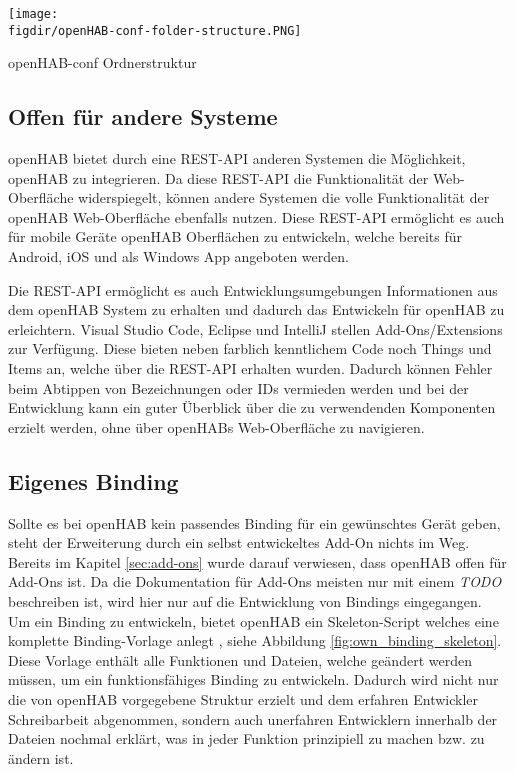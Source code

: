 \smallskip
{
	\centering
	\captionsetup{type=figure}
	\texttt{[image: \\figdir/openHAB-conf-folder-structure.PNG]}
	\caption{openHAB-conf Ordnerstruktur \label{fig:openHAB-conf-folder-structure}}
}

\subsection{Offen für andere Systeme}
openHAB bietet durch eine REST-API anderen Systemen die Möglichkeit, openHAB zu integrieren. Da diese REST-API die Funktionalität der Web-Oberfläche widerspiegelt, können andere Systemen die volle Funktionalität der openHAB Web-Oberfläche ebenfalls nutzen. Diese REST-API ermöglicht es auch für mobile Geräte openHAB Oberflächen zu entwickeln, welche bereits für Android, iOS und als Windows App angeboten werden.

Die REST-API ermöglicht es auch Entwicklungsumgebungen Informationen aus dem openHAB System zu erhalten und dadurch das Entwickeln für openHAB zu erleichtern. Visual Studio Code, Eclipse und IntelliJ stellen Add-Ons/Extensions zur Verfügung. Diese bieten neben farblich kenntlichem Code noch Things und Items an, welche über die REST-API erhalten wurden. Dadurch können Fehler beim Abtippen von Bezeichnungen oder IDs vermieden werden und bei der Entwicklung kann ein guter Überblick über die zu verwendenden Komponenten erzielt werden, ohne über openHABs Web-Oberfläche zu navigieren.

\subsection{Eigenes Binding}
Sollte es bei openHAB kein passendes Binding für ein gewünschtes Gerät geben, steht der Erweiterung durch ein selbst entwickeltes Add-On nichts im Weg. Bereits im Kapitel \ref{sec:add-ons} wurde darauf verwiesen, dass openHAB offen für Add-Ons ist. Da die Dokumentation für Add-Ons meisten nur mit einem \textit{TODO} beschreiben ist, wird hier nur auf die Entwicklung von Bindings eingegangen.\\
Um ein Binding zu entwickeln, bietet openHAB ein Skeleton-Script welches eine komplette Binding-Vorlage anlegt \cite{openHAB05:OH}, siehe Abbildung \ref{fig:own_binding_skeleton}. Diese Vorlage enthält alle Funktionen und Dateien, welche geändert werden müssen, um ein funktionsfähiges Binding zu entwickeln. Dadurch wird nicht nur die von openHAB vorgegebene Struktur erzielt und dem erfahren Entwickler Schreibarbeit abgenommen, sondern auch unerfahren Entwicklern innerhalb der Dateien nochmal erklärt, was in jeder Funktion prinzipiell zu machen bzw. zu ändern ist.

